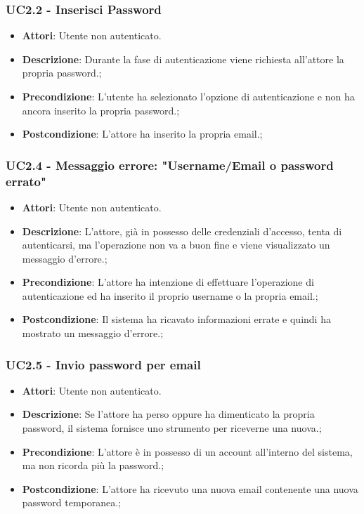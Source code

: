 \subsubsection{UC2.2 - Inserisci Password} 
\label{sssec:UC2.2} 
\begin{itemize} 
\item \textbf{Attori}: Utente non autenticato.
\item \textbf{Descrizione}: Durante la fase di autenticazione viene richiesta all'attore la propria password.;
\item \textbf{Precondizione}: L'utente ha selezionato l'opzione di autenticazione e non ha ancora inserito la propria password.;
\item \textbf{Postcondizione}: L'attore ha inserito la propria email.;
\end{itemize} 
\subsubsection{UC2.4 - Messaggio errore: "Username/Email o password errato"} 
\label{sssec:UC2.4} 
\begin{itemize} 
\item \textbf{Attori}: Utente non autenticato.
\item \textbf{Descrizione}: L'attore, già in possesso delle credenziali d'accesso, tenta di autenticarsi, ma l'operazione non va a buon fine e viene visualizzato un messaggio d'errore.;
\item \textbf{Precondizione}: L'attore ha intenzione di effettuare l'operazione di autenticazione ed ha inserito il proprio username o la propria email.;
\item \textbf{Postcondizione}: Il sistema ha ricavato informazioni errate e quindi ha mostrato un messaggio d'errore.;
\end{itemize} 
\subsubsection{UC2.5 - Invio password per email} 
\label{sssec:UC2.5} 
\begin{itemize} 
\item \textbf{Attori}: Utente non autenticato.
\item \textbf{Descrizione}: Se l'attore ha perso oppure ha dimenticato la propria password, il sistema fornisce uno strumento per riceverne una nuova.;
\item \textbf{Precondizione}: L'attore è in possesso di un account all'interno del sistema, ma non ricorda più la password.;
\item \textbf{Postcondizione}: L'attore ha ricevuto una nuova email contenente una nuova password temporanea.;
\end{itemize} 
